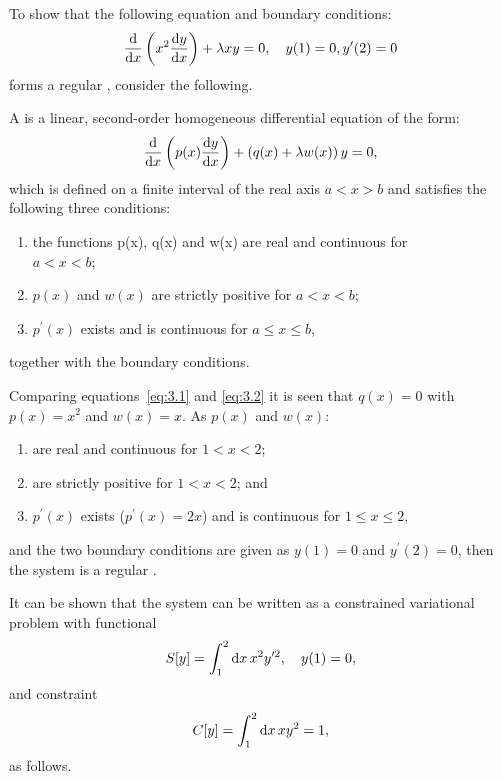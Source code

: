 To show that the following equation and boundary conditions:
\begin{equation}
\label{eq:3.1}
	\frac{\mathrm{d}}{\mathrm{d}x}\left(x^2\frac{\mathrm{d}y}{\mathrm{d}x}\right)+\lambda x y = 0,\quad y(1)=0, y^\prime(2)=0
\end{equation}
forms a regular \sls, consider the following.

A \sls is a linear, second-order homogeneous differential equation of the form:
\begin{equation}
\label{eq:3.2}
	\frac{\mathrm{d}}{\mathrm{d}x}\left(p(x)\frac{\mathrm{d}y}{\mathrm{d}x}\right) + \left(q(x) + \lambda w(x)\right) y=0,
\end{equation}
which is defined on a finite interval of the real axis $a<x>b$ and satisfies the following three conditions:
\begin{enumerate}
  \item 
  the functions p(x), q(x) and w(x) are real and continuous for\\ $a<x<b$;
  \item
  $p(x)$ and $w(x)$ are strictly positive for $a<x<b$;
  \item
  $p^\prime(x)$ exists and is continuous for $a\leq x\leq b$,
\end{enumerate}
together with the boundary conditions.

Comparing equations~\eqref{eq:3.1} and \eqref{eq:3.2} it is seen that $q(x)=0$ with $p(x) = x^2$ and $w(x)=x$. As $p(x)$ and $w(x)$:
\begin{enumerate}
\item
are real and continuous for $1<x<2$;
\item
are strictly positive for $1<x<2$; and
\item
$p^\prime(x)$ exists ($p^\prime(x) = 2x$) and is continuous for $1\leq x\leq 2$,
\end{enumerate}
and the two boundary conditions are given as $y(1)=0$ and $y^\prime(2)=0$, then the system is a regular \sls.

It can be shown that the system can be written as a constrained variational problem with functional
\begin{equation}
	\label{eq:3.3}
	S[y] = \int_{1}^{2}\mathrm{d} x\, x^2 y^{\prime 2},\quad y(1) = 0,
\end{equation}
and constraint
\begin{equation}
	\label{eq:3.4}
	C[y] = \int_{1}^{2}\mathrm{d} x\, x y^2 = 1,
\end{equation}
as follows.


